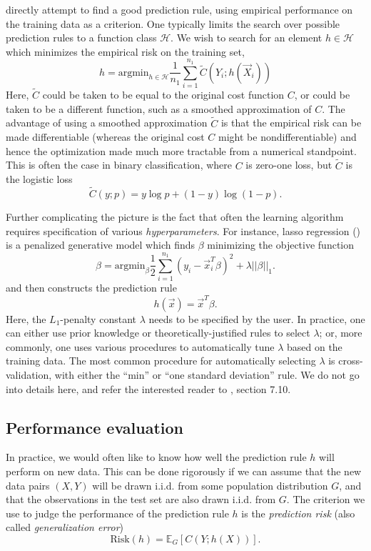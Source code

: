 \begin{itemize}
  directly attempt to find a good prediction rule, using empirical
  performance on the training data as a criterion. One typically
  limits the search over possible prediction rules to a function class
  $\mathcal{H}$.  We wish to search for an element $h \in \mathcal{H}$
  which minimizes the empirical risk on the training set,
\[
h = \text{argmin}_{h \in \mathcal{H}} \frac{1}{n_1} \sum_{i=1}^{n_1} \tilde{C}(Y_i; h(\vec{X}_i))
\]
Here, $\tilde{C}$ could be taken to be equal to the original cost
function $C$, or could be taken to be a different function, such as a
smoothed approximation of $C$.  The advantage of using a smoothed
approximation $\tilde{C}$ is that the empirical risk can be made
differentiable (whereas the original cost $C$ might be
nondifferentiable) and hence the optimization made much more tractable
from a numerical standpoint.  This is often the case in binary
classification, where $C$ is zero-one loss, but $\tilde{C}$ is the logistic loss
\[
\tilde{C}(y; p) = y \log p + (1-y) \log (1-p).
\]
\end{itemize}
Further complicating the picture is the fact that often the learning
algorithm requires specification of various \emph{hyperparameters}.
For instance, lasso regression (\cite{Hastie2009a}) is a penalized generative model which
finds $\beta$ minimizing the objective function
\[
\beta = \text{argmin}_\beta \frac{1}{2}\sum_{i=1}^{n_1}(y_i - \vec{x}_i^T \beta)^2 + \lambda ||\beta||_1.
\]
and then constructs the prediction rule
\[
h(\vec{x}) = \vec{x}^T \beta.
\]
Here, the $L_1$-penalty constant $\lambda$ needs to be specified by
the user.  In practice, one can either use prior knowledge or
theoretically-justified rules to select $\lambda$; or, more commonly,
one uses various procedures to automatically tune $\lambda$ based on
the training data.  The most common procedure for automatically
selecting $\lambda$ is cross-validation, with either the ``min'' or
``one standard deviation'' rule.  We do not go into details here, and
refer the interested reader to \cite{Hastie2009a}, section 7.10.

\subsection{Performance evaluation}

In practice, we would often like to know how well the prediction rule
$h$ will perform on new data.  This can be done rigorously if we can
assume that the new data pairs $(X, Y)$ will be drawn i.i.d. from some
population distribution $G$, and that the observations in the test set
are also drawn i.i.d. from $G$.  The criterion we use to judge the
performance of the prediction rule $h$ is the \emph{prediction risk} (also called \emph{generalization error})
\[
\text{Risk}(h) = \mathbb{E}_G[C(Y; h(X))].
\]

